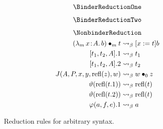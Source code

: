 
\begin{figure}
    \centering
    \begin{minipage}{0.5\textwidth}
        $$\BinderReductionOne$$
    \end{minipage}%
    \begin{minipage}{0.5\textwidth}
        $$\BinderReductionTwo$$
    \end{minipage}%
    $$\NonbinderReduction$$
    \begin{align*}
        ({\lambda_m}\, x\! : \! A.\, b) \bullet_{m} t &\rightsquigarrow_\beta [x := t]b \\
        [t_1, t_2, A].1 &\rightsquigarrow_\beta t_1 \\
        [t_1, t_2, A].2 &\rightsquigarrow_\beta t_2 \\
        J(A, P, x, y, \text{refl}(z), w) &\rightsquigarrow_\beta w \bullet_{0} z \\
        \vartheta(\text{refl}(t.1)) &\rightsquigarrow_\beta \text{refl}(t) \\
        \vartheta(\text{refl}(t.2)) &\rightsquigarrow_\beta \text{refl}(t) \\
        \varphi(a, f, e).1 &\rightsquigarrow_\beta a
    \end{align*}
    \caption{Reduction rules for arbitrary syntax.}
\end{figure}


